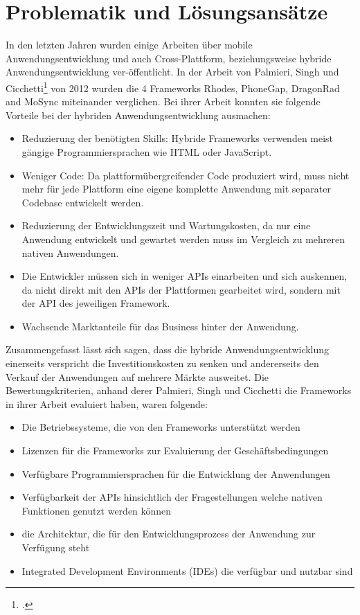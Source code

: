 \chapter{Problematik und Lösungsansätze}

In den letzten Jahren wurden einige Arbeiten über mobile Anwendungsentwicklung und auch Cross-Plattform, beziehungsweise hybride Anwendungsentwicklung ver-öffentlicht. In der Arbeit von Palmieri, Singh und Cicchetti\footcite{ComparisonCrossPlatMobDevTools} von 2012 wurden die 4 Frameworks Rhodes, PhoneGap, DragonRad and MoSync miteinander verglichen. Bei ihrer Arbeit konnten sie folgende Vorteile bei der hybriden Anwendungsentwicklung ausmachen: 

\begin{itemize}
\item Reduzierung der benötigten Skills: Hybride Frameworks verwenden meist gängige Programmiersprachen wie HTML oder JavaScript.
\item Weniger Code: Da plattformübergreifender Code produziert wird, muss nicht mehr für jede Plattform eine eigene komplette Anwendung mit separater Codebase entwickelt werden.
\item Reduzierung der Entwicklungszeit und Wartungskosten, da nur eine Anwendung entwickelt und gewartet werden muss im Vergleich zu mehreren nativen Anwendungen. 
\item Die Entwickler müssen sich in weniger APIs einarbeiten und sich auskennen, da nicht direkt mit den APIs der Plattformen gearbeitet wird, sondern mit der API des jeweiligen Framework.
\item Wachsende Marktanteile für das Business hinter der Anwendung. 
\end{itemize}

Zusammengefasst lässt sich sagen, dass die hybride Anwendungsentwicklung einerseits verspricht die Investitionskosten zu senken und andererseits den Verkauf der Anwendungen auf mehrere Märkte ausweitet. Die Bewertungskriterien, anhand derer Palmieri, Singh und Cicchetti die Frameworks in ihrer Arbeit evaluiert haben, waren folgende: 

\begin{itemize}
\item Die Betriebssysteme, die von den Frameworks unterstützt werden
\item Lizenzen für die Frameworks zur Evaluierung der Geschäftsbedingungen
\item Verfügbare Programmiersprachen für die Entwicklung der Anwendungen
\item Verfügbarkeit der APIs hinsichtlich der Fragestellungen welche nativen Funktionen genutzt werden können
\item die Architektur, die für den Entwicklungsprozess der Anwendung zur Verfügung steht
\item Integrated Development Environments (IDEs) die verfügbar und nutzbar sind
\end{itemize}

